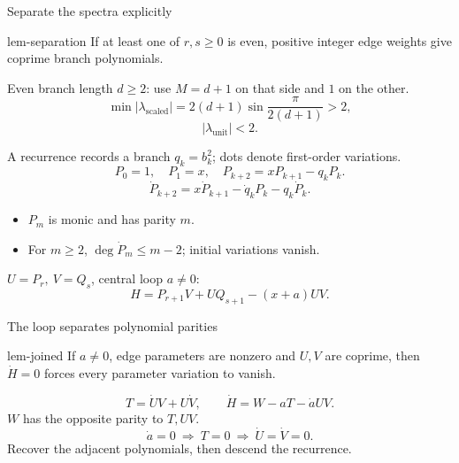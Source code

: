 \documentclass{beamer}
\begin{document}
\begin{frame}{Separate the spectra explicitly}
\begin{bookresult}{lem-separation}
If at least one of $r,s\geq0$ is even, positive integer edge weights give coprime branch polynomials.
\end{bookresult}
Even branch length $d\geq2$: use $M=d+1$ on that side and $1$ on the other.
\[
\min |\lambda_{\mathrm{scaled}}|=2(d+1)\sin\frac{\pi}{2(d+1)}>2,
\]
\[
|\lambda_{\mathrm{unit}}|<2.
\]
\end{frame}

\begin{frame}{A recurrence records a branch}
$q_k=b_k^2$; dots denote first-order variations.
\[P_0=1,\quad P_1=x,\quad P_{k+2}=xP_{k+1}-q_kP_k.\]
\[\dot P_{k+2}=x\dot P_{k+1}-\dot q_kP_k-q_k\dot P_k.\]
\begin{itemize}\item $P_m$ is monic and has parity $m$.
\item For $m\geq2$, $\deg\dot P_m\leq m-2$; initial variations vanish.
\end{itemize}
$U=P_r,\ V=Q_s$, central loop $a\ne0$:
\[H=P_{r+1}V+UQ_{s+1}-(x+a)UV.\]
\end{frame}

\begin{frame}{The loop separates polynomial parities}
\begin{bookresult}{lem-joined}
If $a\ne0$, edge parameters are nonzero and $U,V$ are coprime, then $\dot H=0$ forces every parameter variation to vanish.
\end{bookresult}
\[ T=\dot UV+U\dot V,\qquad \dot H=W-aT-\dot aUV.\]
$W$ has the opposite parity to $T,UV$.
\[\dot a=0\ \Longrightarrow\ T=0\ \Longrightarrow\ \dot U=\dot V=0.\]
Recover the adjacent polynomials, then descend the recurrence.
\end{frame}
\end{document}
